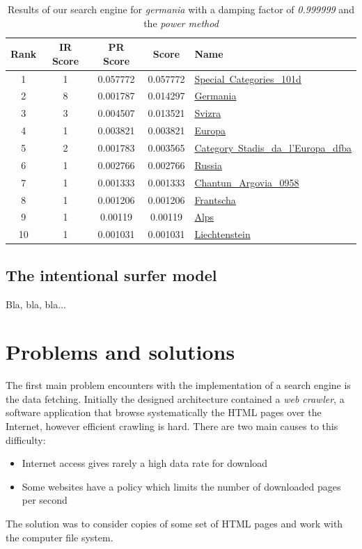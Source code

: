 \documentclass[pdftex,12pt,a4paper]{article}
\begin{document}
\begin{table}[H]
\centering
\begin{tabular}{ | c | c | c | c | l | }
\hline
Rank & IR Score & PR Score &  Score & Name \\ \hline
1 & 1 & 0.057772 & 0.057772 & \href{http://rm.wikipedia.org/wiki/Special~Categories_101d}{Special~Categories\_101d} \\ \hline
2 & 8 & 0.001787 & 0.014297 & \href{http://rm.wikipedia.org/wiki/Germania}{Germania} \\ \hline
3 & 3 & 0.004507 & 0.013521 & \href{http://rm.wikipedia.org/wiki/Svizra}{Svizra} \\ \hline
4 & 1 & 0.003821 & 0.003821 & \href{http://rm.wikipedia.org/wiki/Europa}{Europa} \\ \hline
5 & 2 & 0.001783 & 0.003565 & \href{http://rm.wikipedia.org/wiki/Category~Stadis_da_l'Europa_dfba}{Category~Stadis\_da\_l'Europa\_dfba} \\ \hline
6 & 1 & 0.002766 & 0.002766 & \href{http://rm.wikipedia.org/wiki/Russia}{Russia} \\ \hline
7 & 1 & 0.001333 & 0.001333 & \href{http://rm.wikipedia.org/wiki/Chantun_Argovia_0958}{Chantun\_Argovia\_0958} \\ \hline
8 & 1 & 0.001206 & 0.001206 & \href{http://rm.wikipedia.org/wiki/Frantscha}{Frantscha} \\ \hline
9 & 1 & 0.00119 & 0.00119 & \href{http://rm.wikipedia.org/wiki/Alps}{Alps} \\ \hline
10 & 1 & 0.001031 & 0.001031 & \href{http://rm.wikipedia.org/wiki/Liechtenstein}{Liechtenstein} \\ \hline
\end{tabular}
\caption{Results of our search engine for \emph{germania} with a damping factor of \emph{0.999999} and the \emph{power method}}
\label{table_d=0.999999}
\end{table}


\subsection{The intentional surfer model}
Bla, bla, bla...


\section{Problems and solutions}

The first main problem encounters with the implementation of a search engine is the data fetching. Initially the designed architecture contained a \emph{web crawler}, a software application that browse systematically the HTML pages over the Internet, however efficient crawling is hard.
There are two main causes to this difficulty:
\begin{itemize}
\item Internet access gives rarely a high data rate for download
\item Some websites have a policy which limits the number of downloaded pages per second
\end{itemize}
The solution was to consider copies of some set of HTML pages and work with the computer file system.
\end{document}

